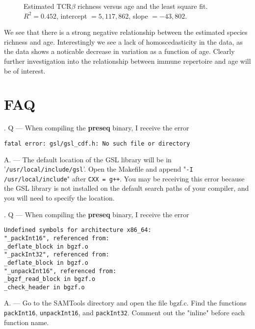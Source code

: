 \documentclass[11pt, titlepage]{article}
\newcounter{question}
\newcommand\Que[1]{%
   \leavevmode\par
   \stepcounter{question}
   \noindent
   \thequestion. Q --- #1\par}
\newcommand\Ans[1]{%
    \leavevmode\par\noindent
   {\leftskip37pt
    A. --- #1 \par }}
\newcommand{\fn}[1]{\texttt{#1}}
\newcommand{\tab}{\hspace*{2em}}
\begin{document}
 \begin{figure}[h!]
\caption{Estimated TCR$\beta$ richness versus age and the
least square fit.  $R^{2} = 0.452$, intercept $ = 5,117,862$, slope $= -43,802$.
}
\end{figure}

We see that there is a strong negative relationship between the
estimated species richness and age.  Interestingly we see a lack
of homoscedasticity in the data, as the data shows a noticable
decrease in variation as a function of age.
Clearly further investigation into the relationship between
immune repertoire and age will be of interest.



\newpage


\section{FAQ}

\Que{When compiling the \textbf{preseq} binary, I receive the error

\fn{fatal error: gsl/gsl\_cdf.h: No such file or directory
}
}

\Ans{The default location of the GSL library will be in '\fn{/usr/local/include/gsl}'. Open the Makefile and append "\fn{-I /usr/local/include}" after \fn{CXX = g++}.  You may be receiving this error because the GSL library is not installed on the default search paths of your compiler, and you will need to specify the location.  }




\Que{When compiling the \textbf{preseq} binary, I receive the error

\fn{Undefined symbols for architecture x86\_64: ~\\
\tab"\_packInt16", referenced from:~\\
\tab\tab\_deflate\_block in bgzf.o~\\
 \tab"\_packInt32", referenced from:~\\
 \tab\tab\_deflate\_block in bgzf.o~\\
 \tab "\_unpackInt16", referenced from:~\\
   \tab\tab   \_bgzf\_read\_block in bgzf.o~\\
    \tab\tab  \_check\_header in bgzf.o~\\
}
}

\Ans{
Go to the SAMTools directory and open the file bgzf.c. Find the functions \fn{packInt16}, \fn{unpackInt16}, and \fn{packInt32}. Comment out the "inline" before each function name.
}
\end{document}
